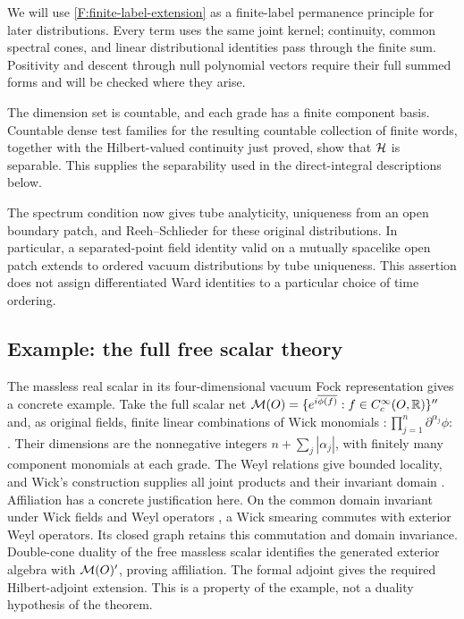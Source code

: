 We will use \eqref{F:finite-label-extension} as a finite-label permanence
principle for later distributions. Every term uses the same joint kernel;
continuity, common spectral cones, and linear distributional identities
pass through the finite sum. Positivity and descent through null
polynomial vectors require their full summed forms and will be checked
where they arise.

The dimension set is countable, and each grade has a finite component
basis. Countable dense test families for the resulting countable
collection of finite words, together with the Hilbert-valued continuity
just proved, show that $\mathcal H$ is separable. This supplies the separability
used in the direct-integral descriptions below.

The spectrum condition now gives tube analyticity, uniqueness from an open
boundary patch, and Reeh--Schlieder for these original distributions. In
particular, a separated-point field identity valid on a mutually spacelike
open patch extends to ordered vacuum distributions by tube uniqueness.
This assertion does not assign differentiated Ward identities to a
particular choice of time ordering.

\subsection{Example: the full free scalar theory}
\label{F:free-scalar-example}

The massless real scalar in its four-dimensional vacuum Fock
representation gives a concrete example. Take the full scalar net
$\mathcal M(O)=\{e^{i\overline{\phi(f)}}:
f\in C_c^\infty(O,\mathbb R)\}^{\prime\prime}$ and, as original fields, finite
linear combinations of Wick monomials
$:\!\prod_{j=1}^n\partial^{\alpha_j}\phi\!:$.
Their dimensions are the nonnegative integers
$n+\sum_j|\alpha_j|$, with finitely many component monomials at
each grade. The Weyl relations give bounded locality, and Wick's
construction supplies all joint products and their invariant domain
\cite[Theorem~5.7 and its following remark]{BrunettiFredenhagenKoehler1996}.
Affiliation has a concrete justification here. On the common domain
invariant under Wick fields and Weyl operators
\cite[Section~2.2, equation~(11)]{BrunettiFredenhagen2000},
a Wick smearing commutes with exterior Weyl operators. Its closed
graph retains this commutation and domain invariance. Double-cone
duality of the free massless scalar
\cite[Section~3, Corollary~2]{HislopLongo1982} identifies the generated
exterior algebra with $\mathcal M(O)'$, proving affiliation. The formal
adjoint gives the required Hilbert-adjoint extension. This is a
property of the example, not a duality hypothesis of the theorem.

